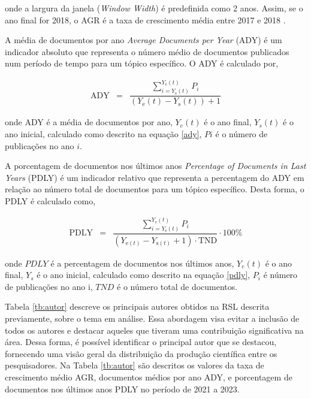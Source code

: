 \noindent onde a largura da janela (\textit{Window Width}) é predefinida como 2 anos. Assim, se o ano final for 2018, o AGR é a taxa de crescimento média entre 2017 e 2018 \cite{scientopy}.

A média de documentos por ano  \textit{Average Documents per Year} (ADY) é um indicador absoluto que representa o número médio de documentos publicados num período de tempo para um tópico específico. O ADY é calculado por,

\begin{eqnarray}
	\mathrm{ADY}&=&\dfrac{\sum_{i={Y_{\mathrm{s}}}(t)}^{Y_{\mathrm{e}}(t)} P_i}{\left(Y_{\mathrm{e}}(t)-Y_{\mathrm{s}}(t)\right)+1}\label{ady}
\end{eqnarray}

\noindent onde ADY é a média de documentos por ano, $Y_e(t)$ é o ano final, $Y_s(t)$ é o ano inicial, calculado como descrito na equação \eqref{ady}, $Pi$ é o número de publicações no ano $i$.

A porcentagem de documentos nos últimos anos  \textit{Percentage of Documents in Last Years} (PDLY) é um indicador relativo que representa a percentagem do ADY em relação ao número total de documentos para um tópico específico. Desta forma, o PDLY é calculado como,

\begin{eqnarray}
	\mathrm{PDLY}&=&\dfrac{\sum_{i={Y_{\mathrm{s}}(t)}}^{Y_{\mathrm{e}}(t)} P_i}{\left(Y_{\mathrm{e}(t)}-Y_{\mathrm{s}(t)}+1\right) \cdot \mathrm{TND}} \cdot 100 \%\label{pdly}
\end{eqnarray}

\noindent onde $PDLY$ é a percentagem de documentos nos últimos anos, $Y_e(t)$ é o ano final, $Y_s$ é o ano inicial, calculado como descrito na equação \eqref{pdly}, $P_i$ é número de publicações no ano i, $TND$ é o número total de documentos.

Tabela \ref{tb:autor} descreve os principais autores obtidos na RSL descrita previamente, sobre o tema em análise. Essa abordagem visa evitar a inclusão de todos os autores e destacar aqueles que tiveram uma contribuição significativa na área. Dessa forma, é possível identificar o principal autor que se destacou, fornecendo uma visão geral da distribuição da produção científica entre os pesquisadores. Na Tabela \ref{tb:autor} são descritos os valores da taxa de crescimento médio AGR, documentos médios por ano ADY, e porcentagem de documentos nos últimos anos PDLY no período de 2021 a 2023.

